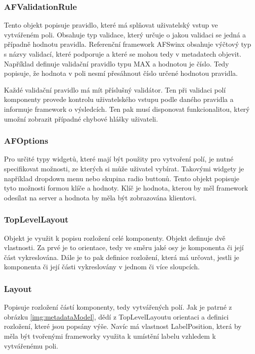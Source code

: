 \subsubsection{AFValidationRule}
Tento objekt popisuje pravidlo, které má splňovat uživatelský vstup ve vytvářeném poli. Obsahuje typ validace, který určuje o jakou validaci se jedná a případně hodnotu pravidla. Referenční framework AFSwinx obsahuje výčtový typ s názvy validací, které podporuje a které se mohou tedy v metadatech objevit. Například definuje validační pravidlo typu MAX a hodnotou je číslo. Tedy popisuje, že hodnota v poli nesmí přesáhnout číslo určené hodnotou pravidla. 

Každé validační pravidlo má mít příslušný validátor. Ten při validaci polí komponenty provede kontrolu uživatelského vstupu podle daného pravidla a informuje framework o výsledcích. Ten pak musí disponovat funkcionalitou, který umožní zobrazit případné chybové hlášky uživateli. 

\subsubsection{AFOptions}
Pro určité typy widgetů, které mají být použity pro vytvoření polí, je nutné specifikovat možnosti, ze kterých si může uživatel vybírat. Takovými widgety je například dropdown menu nebo skupina radio buttonů. Tento objekt popisuje tyto možnosti formou klíče a hodnoty. Klíč je hodnota, kterou by měl framework odesílat na server a hodnota by měla být zobrazována klientovi.

\subsubsection{TopLevelLayout}
Objekt je využit k popisu rozložení celé komponenty. Objekt definuje dvě vlastnosti. Za prvé je to orientace, tedy ve směru jaké osy je komponenta či její část vykreslována. Dále je to pak definice rozložení, která má určovat, jestli je komponenta či její části vykreslovány v jednom či více sloupcích. 

\subsubsection{Layout}
Popisuje rozložení částí komponenty, tedy vytvářených polí. Jak je patrné z obrázku \ref{img:metadataModel}, dědí z TopLevelLayoutu orientaci a definici rozložení, které jsou popsány výše. Navíc má vlastnost LabelPosition, která by měla být tvořenými frameworky využita k umístění labelu vzhledem k vytvářenému poli.

